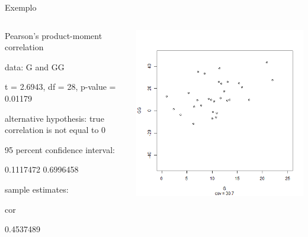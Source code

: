 \documentclass{beamer}
\begin{document}
\begin{frame}{Exemplo}
  \begin{columns}
    \begin{column}{5cm}
      \begin{block}{}
        \tiny
        Pearson's product-moment correlation

        data:  G and GG
        
        t = 2.6943, df = 28, p-value = 0.01179
        
        alternative hypothesis: true correlation is not equal to 0
        
        95 percent confidence interval:
        
        0.1117472 0.6996458
        
        sample estimates:
        
        cor
        
        0.4537489
        
      \end{block}
   \end{column}
    \begin{column}{5cm}
  \begin{center}
    \includegraphics[height=.8\textheight]{Cap17/anim-3}
  \end{center}
    \end{column}
\end{columns}
\end{frame}
\end{document}
